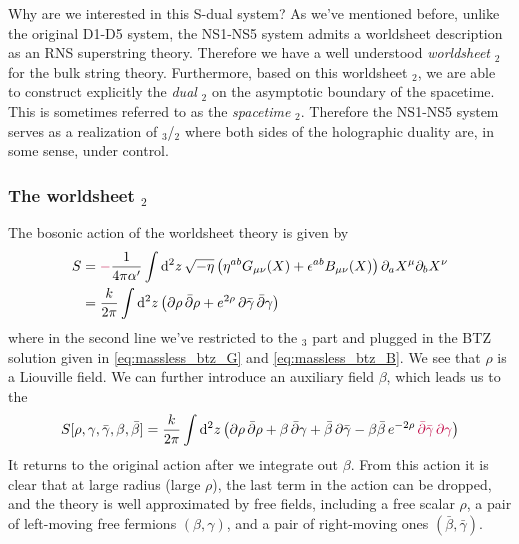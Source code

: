 \documentclass[11pt,a4paper]{article}
\newcommand{\ads}[1]{\text{AdS}\ensuremath{_{#1}}}
\newcommand{\cft}[1]{\text{CFT}\ensuremath{_{#1}}}
\begin{document}
	Why are we interested in this S-dual system? As we've mentioned before, unlike the original D1-D5 system, the NS1-NS5 system admits a worldsheet description as an RNS superstring theory. Therefore we have a well understood \textit{worldsheet} \cft{2} for the bulk string theory. Furthermore, based on this worldsheet \cft{2}, we are able to construct explicitly the \textit{dual} \cft{2} on the asymptotic boundary of the spacetime. This is sometimes referred to as the \textit{spacetime} \cft{2}. Therefore the NS1-NS5 system serves as a realization of \ads{3}/\cft{2} where both sides of the holographic duality are, in some sense, under control. 
	
\subsubsection{The worldsheet \cft{2}}
	
	The bosonic action of the worldsheet theory is given by 
	\begin{equation}
	\begin{aligned}
		S &= \sidenote{-} \frac{1}{4\pi\alpha'}
			\int \dd[2]{z} \sqrt{-\eta}\,\big(
					\eta^{ab} G_{\mu\nu} (X)
					+ \epsilon^{ab} B_{\mu\nu} (X)
				\big)\,\pdd{a} X^\mu \pdd{b} X^\nu \\
		&= \frac{k}{2\pi}
			\int \dd[2]{z} \pqty{
				\pd\rho\,\pdbar\rho
				+ e^{2\rho}\,\pd\bar{\gamma}\,\pdbar\gamma
			} \\
	\end{aligned}
	\end{equation}
	where in the second line we've restricted to the \ads{3} part and plugged in the BTZ solution given in \eqref{eq:massless_btz_G} and \eqref{eq:massless_btz_B}. We see that $\rho$ is a Liouville field. 
	We can further introduce an auxiliary field $\beta$, which leads us to the 
	\begin{equation}
		S[\rho,\gamma,\bar{\gamma},\beta,\bar{\beta}]
		= \frac{k}{2\pi}
			\int \dd[2]{z} \pqty{
				\pd\rho\,\pdbar\rho
				+ \beta\,\pdbar\gamma
				+ \bar{\beta}\,\pd\bar{\gamma}
				- \beta \bar{\beta}\,e^{-2\rho}\,
					\sidenote{\pdbar\bar{\gamma}\,\pd\gamma}
			}
	\end{equation}
	It returns to the original action after we integrate out $\beta$. From this action it is clear that at large radius (large $\rho$), the last term in the action can be dropped, and the theory is well approximated by free fields, including a free scalar $\rho$, a pair of left-moving free fermions $(\beta,\gamma)$, and a pair of right-moving ones $(\bar{\beta},\bar{\gamma})$. 
	
\end{document}
